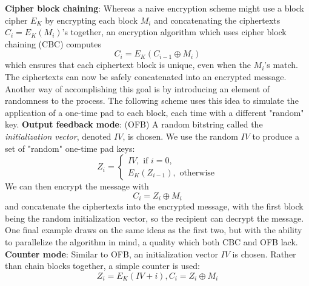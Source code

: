 \documentclass{article}
\begin{document}
\textbf{Cipher block chaining}: Whereas a naive encryption scheme might use a block cipher $ E_K $ by encrypting each block $ M_i $ and concatenating the ciphertexts $ C_i = E_K(M_i) $'s together, an encryption algorithm which uses cipher block chaining (CBC) computes
$$ C_i = E_K(C_{i - 1} \oplus M_i) $$
which ensures that each ciphertext block is unique, even when the $ M_i $'s match. The ciphertexts can now be safely concatenated into an encrypted message.
\newline \newline
Another way of accomplishing this goal is by introducing an element of randomness to the process. The following scheme uses this idea to simulate the application of a one-time pad to each block, each time with a different "random" key.
\newline \newline
\textbf{Output feedback mode}: (OFB) A random bitstring called the \textit{initialization vector}, denoted $ IV $, is chosen. We use the random $ IV $ to produce a set of "random" one-time pad keys:
$$ Z_i = \begin{cases}
	IV, \text{ if } i = 0, \\
	E_K(Z_{i - 1}), \text{ otherwise}
\end{cases} $$
We can then encrypt the message with
$$ C_i = Z_i \oplus M_i $$
and concatenate the ciphertexts into the encrypted message, with the first block being the random initialization vector, so the recipient can decrypt the message.
\newline \newline
One final example draws on the same ideas as the first two, but with the ability to parallelize the algorithm in mind, a quality which both CBC and OFB lack.
\newline \newline
\textbf{Counter mode}: Similar to OFB, an initialization vector $ IV $ is chosen. Rather than chain blocks together, a simple counter is used:
$$ Z_i = E_K(IV + i), C_i = Z_i \oplus M_i $$
\end{document}
